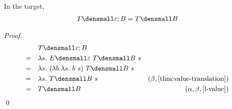 
\begin{lemma}
  \label{thm:tmpl-compose-id-left}
  In the target,
  \begin{align*}
    T\den{\varepsilon; B} = T\den{B}
  \end{align*}
\end{lemma}
    \begin{proof}
        \begin{align*}
            &\quad T\den{\varepsilon; B} \\
            =& \quad \lambda s. ~ E\den{\varepsilon} ~T\den{B} ~s \\
            =& \quad \lambda s. ~ (\lambda b. \lambda s.~ b ~s) ~T\den{B} ~s \\
            =& \quad \lambda s. ~ T\den{B} ~s & (\beta, \cref{thm:value-translation})\\
            =& \quad T\den{B} & (\alpha, \beta, \cref{l-value})
        \end{align*}
        \qed
    \end{proof}


